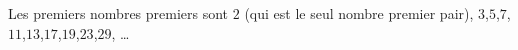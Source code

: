 
Les premiers nombres premiers sont $2$ (qui est le seul nombre premier pair), $3$,$5$,$7$,$11$,$13$,$17$,$19$,$23$,$29$, \ldots

